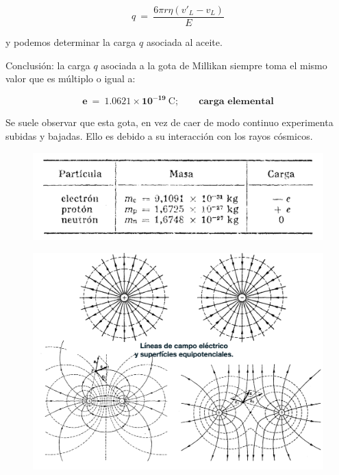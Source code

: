\begin{equation}
q\ =\ \dfrac{6\pi r \eta (v'_L-v_L)}{E}	
\end{equation}

y podemos determinar la carga $q$ asociada al aceite.

Conclusión: la carga $q$ asociada a la gota de Millikan siempre toma el mismo valor que es múltiplo o igual a:

\begin{equation}
\boldsymbol{e \ = \ 1.0621\times 10^{-19} \ \mathrm{C}};	 \qquad \textbf{carga elemental}
\end{equation}

\textcolor{gris}{Se suele observar que esta gota, en vez de caer de modo continuo experimenta subidas y bajadas. Ello es debido a su interacción con los rayos cósmicos.}

\begin{figure}[H]
	\centering
	\includegraphics[width=.9\textwidth]{imagenes/imagenes22/T22IM14.png}
\end{figure}


\begin{figure}[H]
	\centering
	\includegraphics[width=.9\textwidth]{imagenes/imagenes22/T22IM13.png}
\end{figure}

